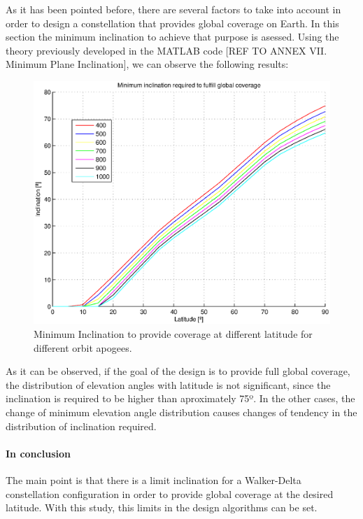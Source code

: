 As it has been pointed before, there are several factors to take into account in order to design a constellation that provides global coverage on Earth. In this section the minimum inclination to achieve that purpose is asessed. Using the theory previously developed in the MATLAB code [{REF TO ANNEX VII. Minimum Plane Inclination}], we can observe the following results:

\begin{figure}[H]
	\includegraphics[scale=0.8]{MinimumInclinationPlot}
	\caption{Minimum Inclination to provide coverage at different latitude for different orbit apogees.}	
\end{figure}

As it can be observed, if the goal of the design is to provide full global coverage, the distribution of elevation angles with latitude is not significant, since the inclination is required to be higher than aproximately 75º. In the other cases, the change of minimum elevation angle distribution causes changes of tendency in the distribution of inclination required. 

\paragraph{In conclusion\\}
The main point is that there is a limit inclination for a Walker-Delta constellation configuration in order to provide global coverage at the desired latitude. With this study, this limits in the design algorithms can be set.